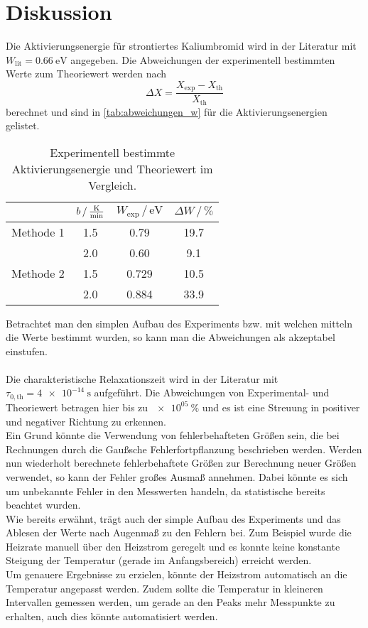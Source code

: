 \section{Diskussion}
\label{sec:Diskussion}
Die Aktivierungsenergie für strontiertes Kaliumbromid wird in der Literatur mit $W_\text{lit} = \SI{0.66}{\electronvolt}$\cite{muccillo} angegeben.
Die Abweichungen der experimentell bestimmten Werte zum Theoriewert werden nach
\begin{equation*}
    \Delta X = \frac{X_\text{exp} - X_\text{th}}{X_\text{th}}
\end{equation*}
berechnet und sind in \autoref{tab:abweichungen_w} für die Aktivierungsenergien gelistet.

\begin{table}
    \centering
    \begin{tabular}{c S[table-format=1.1] | S[table-format=1.3] S[table-format=2.2]}
        \toprule
        & $b \,/\, \si{\frac{\kelvin}{\minute}}$ & $W_\text{exp} \,/\, \si{\electronvolt}$ & $\Delta W \,/\, \si{\percent}$ \\
        \midrule
        Methode 1 & 1.5 & 0.79 & 19.7 \\
        & 2.0 & 0.60 & 9.1 \\
        Methode 2 & 1.5 & 0.729 & 10.5 \\
        & 2.0 & 0.884 & 33.9 \\
        \bottomrule
    \end{tabular}
    \caption{Experimentell bestimmte Aktivierungsenergie und Theoriewert im Vergleich.}
    \label{tab:abweichungen_w}
\end{table}
\FloatBarrier

Betrachtet man den simplen Aufbau des Experiments bzw. mit welchen mitteln die Werte bestimmt wurden, so kann man die Abweichungen als akzeptabel einstufen.
\\
\\
Die charakteristische Relaxationszeit wird in der Literatur mit $\tau_{0, \text{th}} = \SI{4e-14}{\second}$\cite{muccillo} aufgeführt.
Die Abweichungen von Experimental- und Theoriewert betragen hier bis zu $\SI{e05}{\percent}$ und es ist eine Streuung in positiver und negativer Richtung zu erkennen.
\\
Ein Grund könnte die Verwendung von fehlerbehafteten Größen sein, die bei Rechnungen durch die Gaußsche Fehlerfortpflanzung beschrieben werden.
Werden nun wiederholt berechnete fehlerbehaftete Größen zur Berechnung neuer Größen verwendet, so kann der Fehler großes Ausmaß annehmen.
Dabei könnte es sich um unbekannte Fehler in den Messwerten handeln, da statistische bereits beachtet wurden.
\\
Wie bereits erwähnt, trägt auch der simple Aufbau des Experiments und das Ablesen der Werte nach Augenmaß zu den Fehlern bei. 
Zum Beispiel wurde die Heizrate manuell über den Heizstrom geregelt und es konnte keine konstante Steigung der Temperatur (gerade im Anfangsbereich) erreicht werden.
\\
Um genauere Ergebnisse zu erzielen, könnte der Heizstrom automatisch an die Temperatur angepasst werden.
Zudem sollte die Temperatur in kleineren Intervallen gemessen werden, um gerade an den Peaks mehr Messpunkte zu erhalten, auch dies könnte automatisiert werden.